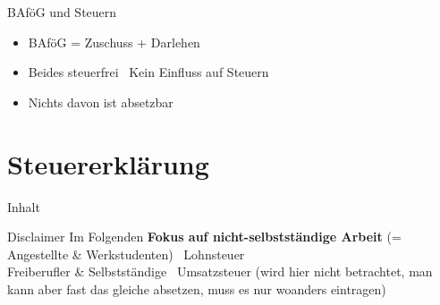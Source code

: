 \documentclass[draft]{beamer}
\newcommand{\n}{\hfill\\\vspace{0.25cm}}
\begin{document}
		\begin{frame}{BAföG und Steuern}
			\begin{itemize}
				\item BAföG = Zuschuss + Darlehen
				\item Beides steuerfrei \textrightarrow\ Kein Einfluss auf Steuern
				\item Nichts davon ist absetzbar
			\end{itemize}
		\end{frame}
	
	\section{Steuererklärung}
	
		\begin{frame}[t]{Inhalt}
		\end{frame}
	
		\begin{frame}{Disclaimer}
			Im Folgenden \textbf{Fokus auf nicht-selbstständige Arbeit} (= Angestellte \& Werkstudenten) \textrightarrow\ Lohnsteuer\n\pause\footnotesize
			Freiberufler \& Selbstständige \textrightarrow\ Umsatzsteuer (wird hier nicht betrachtet, man kann aber fast das gleiche absetzen, muss es nur woanders eintragen)
		\end{frame}
	
\end{document}
